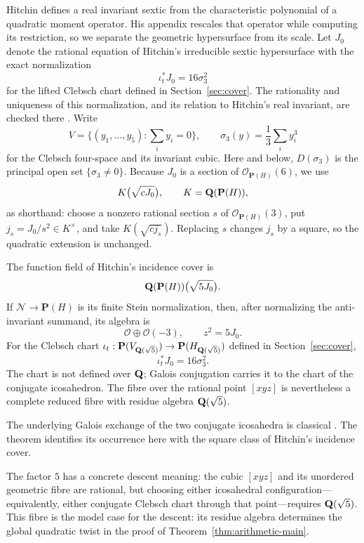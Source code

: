 Hitchin defines a real invariant sextic from the characteristic polynomial
of a quadratic moment operator.  His appendix rescales that operator while
computing its restriction, so we separate the geometric hypersurface from
its scale.  Let \(J_0\) denote the rational equation of Hitchin's irreducible
sextic hypersurface with the exact normalization
\[
 \iota_t^*J_0=16\sigma_3^2
\]
for the lifted Clebsch chart defined in Section~\ref{sec:cover}.  The
rationality and uniqueness of this normalization, and its relation to
Hitchin's real invariant, are checked there
\cite[opening theorem and Appendix]{HitchinIcosahedron}.
Write
\[
 V=\{(y_1,\ldots,y_5):\textstyle\sum_i y_i=0\},\qquad
 \sigma_3(y)=\frac13\sum_i y_i^3
\]
for the Clebsch four-space and its invariant cubic.
Here and below, \(D(\sigma_3)\) is the principal open set
\(\{\sigma_3\ne0\}\).
Because \(J_0\) is a section of \(\mathcal O_{\mathbf P(H)}(6)\), we use
\[
 K\bigl(\sqrt{cJ_0}\bigr),\qquad K=\mathbf Q(\mathbf P(H)),
\]
as shorthand: choose a nonzero rational section \(s\) of
\(\mathcal O_{\mathbf P(H)}(3)\), put \(j_s=J_0/s^2\in K^\times\), and take
\(K(\sqrt{cj_s})\).  Replacing \(s\) changes \(j_s\) by a square, so the
quadratic extension is unchanged.

\begin{theorem}
\label{thm:arithmetic-main}
The function field of Hitchin's incidence cover is
\[
 \mathbf Q(\mathbf P(H))\bigl(\sqrt{5J_0}\bigr).
\]
If \(\mathcal N\to\mathbf P(H)\) is its finite Stein normalization, then,
after normalizing the anti-invariant summand, its algebra is
\[
 \mathcal O\oplus\mathcal O(-3),\qquad z^2=5J_0.
\]
For the Clebsch chart
\(\iota_t:\mathbf P(V_{\mathbf Q(\sqrt5)})\to\mathbf P(H_{\mathbf Q(\sqrt5)})\)
defined in Section~\ref{sec:cover},
\[
 \iota_t^*J_0=16\sigma_3^2.
\]
The chart is not defined over \(\mathbf Q\); Galois conjugation carries it to the
chart of the conjugate icosahedron.  The fibre over the rational point
\([xyz]\) is nevertheless a complete reduced fibre with residue algebra
\(\mathbf Q(\sqrt5)\).
\end{theorem}

The underlying Galois exchange of the two conjugate icosahedra is classical
\cite[Section~1.3]{HMSVOuter}.  The theorem identifies its occurrence here
with the square class of Hitchin's incidence cover.

The factor \(5\) has a concrete descent meaning: the cubic \([xyz]\) and
its unordered geometric fibre are rational, but choosing either
icosahedral configuration---equivalently, either conjugate Clebsch chart
through that point---requires \(\mathbf Q(\sqrt5)\).
This fibre is the model case for the descent: its residue algebra determines
the global quadratic twist in the proof of
Theorem~\ref{thm:arithmetic-main}.

